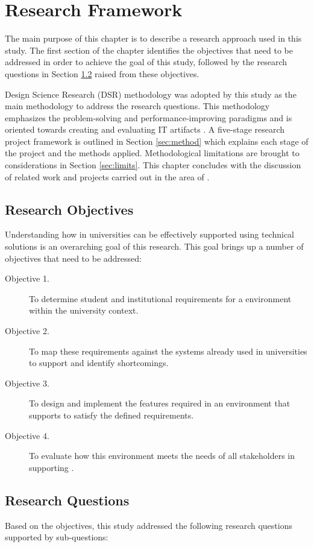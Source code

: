 \chapter{Research Framework\label{cha:method}}
The main purpose of this chapter is to describe a research approach used in this
study. The first section of the chapter identifies the objectives that need to
be addressed in order to achieve the goal of this study, followed by the research
questions in Section \ref{sec:questions} raised from these objectives.

Design Science Research (DSR) methodology was adopted by this study as the main
methodology to address the research questions. This methodology emphasizes the
problem-solving and performance-improving paradigms and is oriented towards
creating and evaluating IT artifacts \citep{Hevner2004}. A five-stage research
project framework is outlined in Section \ref{sec:method} which explains each
stage of the project and the methods applied. Methodological limitations are
brought to considerations in Section \ref{sec:limits}. This chapter concludes
with the discussion of related work and projects carried out in the area of
\LLLsn.

\section{Research Objectives}

Understanding how \LLLs in universities can be effectively supported using
technical solutions is an overarching goal of this research. This goal brings up
a number of objectives that need to be addressed:
\begin{description}
  \item[Objective 1.] To determine student and institutional requirements for a
  \LLLs environment within the university context.
  \item[Objective 2.] To map these requirements against the systems already used
  in universities to support \LLLs and identify shortcomings.
  \item[Objective 3.] To design and implement the features required in an
  environment that supports \LLLs to satisfy the defined requirements.
  \item[Objective 4.] To evaluate how this environment meets the needs of all
  stakeholders in supporting \LLLsn.
\end{description}

\section{Research Questions}
\label{sec:questions}
Based on the objectives, this study addressed the following research questions
supported by sub-questions:

